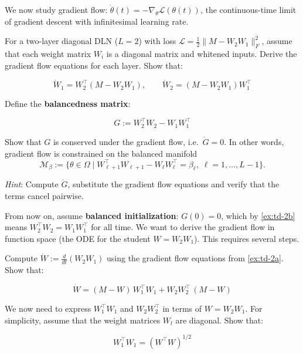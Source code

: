 \documentclass[11pt]{article}
\begin{document}
We now study gradient flow:
\(\dot{\theta}(t) = -\nabla_\theta \mathcal{L}(\theta(t))\), the
continuous-time limit of gradient descent with infinitesimal learning
rate.

\begin{exercise}
\label{ex:td-2a}
For a two-layer diagonal DLN (\(L=2\)) with loss
\(\mathcal{L} = \frac{1}{2}\|M - W_2 W_1\|_F^2\), assume that each weight matrix $W_i$ is a diagonal matrix and whitened inputs.
Derive the gradient flow equations for each layer. Show that:

\[\dot{W}_1 = W_2^\top(M - W_2 W_1), \qquad \dot{W}_2 = (M - W_2 W_1) W_1^\top\]
\end{exercise}


\begin{exercise}
\label{ex:td-2b}
Define the \textbf{balancedness matrix}:

\[G := W_2^\top W_2 - W_1 W_1^\top\]

Show that \(G\) is conserved under the gradient flow,
i.e.~\(\dot{G} = 0\). In other words, gradient flow is constrained on the balanced manifold \begin{equation*}
    \mathcal{M}_{\beta}
    :=
    \{\theta\in\Omega\mid
    W_{\ell+1}^{\top}W_{\ell+1}
    -
    W_{\ell}W_{\ell}^{\top}
    =
    \beta_\ell,\;
    \ell=1,\ldots,L-1\}.
\end{equation*}

\emph{Hint}: Compute
\(\dot{G}\),
substitute the gradient flow equations and verify that the
terms cancel pairwise.
\end{exercise}


From now on, assume \textbf{balanced initialization}:
\(G(0) = 0\), which by \cref{ex:td-2b} means \(W_2^\top W_2 = W_1 W_1^\top\)
for all time. We want to derive the gradient flow in function space (the
ODE for the student \(W = W_2 W_1\)). This requires several steps.

\begin{exercise}
\label{ex:td-2ci}
Compute \(\dot{W} := \frac{d}{dt}(W_2 W_1)\) using the
gradient flow equations from \cref{ex:td-2a}. Show that:

\[\dot{W} = (M - W)\, W_1^\top W_1 + W_2 W_2^\top\, (M - W)\]
\end{exercise}


\begin{exercise}
\label{ex:td-2cii}
We now need to express \(W_1^\top W_1\) and
\(W_2 W_2^\top\) in terms of \(W = W_2 W_1\). For simplicity, assume
that the weight matrices \(W_l\) are diagonal. Show that:

\[W_1^\top W_1 = (W^\top W)^{1/2}\]
\end{exercise}
\end{document}
